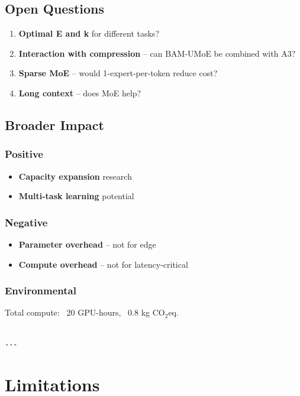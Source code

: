\subsection{Open Questions}

\begin{enumerate}
\item \textbf{Optimal E and k} for different tasks?
\item \textbf{Interaction with compression} -- can BAM-UMoE be combined with A3?
\item \textbf{Sparse MoE} -- would 1-expert-per-token reduce cost?
\item \textbf{Long context} -- does MoE help?

\end{enumerate}
\subsection{Broader Impact}

\subsubsection{Positive}
\begin{itemize}
\item \textbf{Capacity expansion} research
\item \textbf{Multi-task learning} potential

\end{itemize}
\subsubsection{Negative}
\begin{itemize}
\item \textbf{Parameter overhead} -- not for edge
\item \textbf{Compute overhead} -- not for latency-critical

\end{itemize}
\subsubsection{Environmental}
Total compute: ~20 GPU-hours, ~0.8 kg CO$_2$eq.
\begin{lstlisting}

---
\end{lstlisting}

\section{Limitations}

